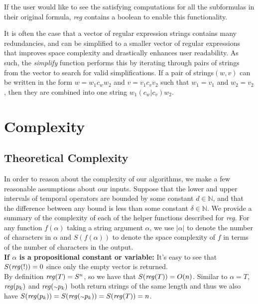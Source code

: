 \documentclass[runningheads]{llncs}
\begin{document}
If the user would like to see the satisfying computations for all the subformulas in their original formula, \textit{reg} contains a boolean to enable this functionality. 

It is often the case that a vector of regular expression strings contains many redundancies, and can be simplified to a smaller vector of regular expressions that improves space complexity and drastically enhances user readability. 
As such, the \textit{simplify} function performs this by iterating through pairs of strings from the vector to search for valid simplifications. 
If a pair of strings$(w, v)$ can be written in the form $w = w_1 c_w w_2$ and $v = v_1 c_v v_2$ such that $w_1 = v_1$ and $w_2 = v_2$, then they are combined into one string $w_1 (c_w | c_v) w_2$.


\section{Complexity} \label{complex}

\subsection{Theoretical Complexity}
 In order to reason about the complexity of our algorithms, we make a few reasonable assumptions about our inputs.
Suppose that the lower and upper intervals of temporal operators are bounded by some constant $d \in \mathbb{N}$, and that the difference between any bound is less than some constant $\delta \in \mathbb{N}$. 
We provide a summary of the complexity of each of the helper functions described for \textit{reg}. 
For any function $f(\alpha)$ taking a string argument $\alpha$, we use $|\alpha|$ to denote the number of characters in $\alpha$ and $S(f(\alpha))$ to denote the space complexity of $f$ in terms of the number of characters in the output.\\
 
\textbf{If $\alpha$ is a propositional constant or variable:}
    It's easy to see that $S(\text{\emph{reg}}(!)) = 0$ since only the empty vector is returned. \\
    By definition $\text{\emph{reg}}(T) = S^n$, so we have that $S(\text{\emph{reg}}(T)) = O(n)$. Similar to $\alpha = T$, $\text{\emph{reg}}(p_k)$ and $\text{\emph{reg}}(\scriptstyle{\sim} \textstyle p_k)$ both return strings of the same length and thus we also have $S(\text{\emph{reg}}(p_k)) = S(\text{\emph{reg}}(\scriptstyle{\sim} \textstyle p_k)) = S(\text{\emph{reg}}(T)) = n$.\\
 
\end{document}
